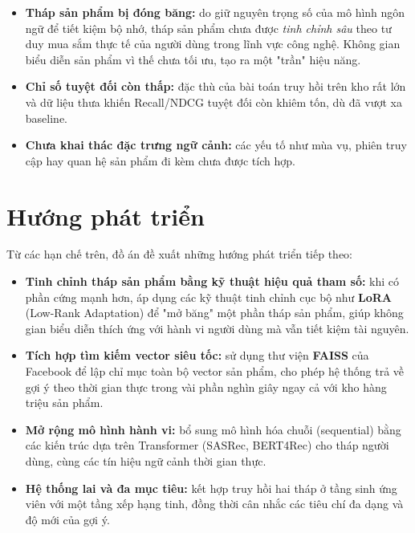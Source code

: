 \begin{itemize}[leftmargin=2em, itemsep=2pt]
    \item \textbf{Tháp sản phẩm bị đóng băng:} do giữ nguyên trọng số của mô hình
    ngôn ngữ để tiết kiệm bộ nhớ, tháp sản phẩm chưa được \textit{tinh chỉnh sâu}
    theo tư duy mua sắm thực tế của người dùng trong lĩnh vực công nghệ. Không gian
    biểu diễn sản phẩm vì thế chưa tối ưu, tạo ra một "trần" hiệu năng.
    \item \textbf{Chỉ số tuyệt đối còn thấp:} đặc thù của bài toán truy hồi trên kho
    rất lớn và dữ liệu thưa khiến Recall/NDCG tuyệt đối còn khiêm tốn, dù đã vượt xa
    baseline.
    \item \textbf{Chưa khai thác đặc trưng ngữ cảnh:} các yếu tố như mùa vụ, phiên
    truy cập hay quan hệ sản phẩm đi kèm chưa được tích hợp.
\end{itemize}

\section{Hướng phát triển}

Từ các hạn chế trên, đồ án đề xuất những hướng phát triển tiếp theo:

\begin{itemize}[leftmargin=2em, itemsep=2pt]
    \item \textbf{Tinh chỉnh tháp sản phẩm bằng kỹ thuật hiệu quả tham số:} khi có
    phần cứng mạnh hơn, áp dụng các kỹ thuật tinh chỉnh cục bộ như \textbf{LoRA}
    (Low-Rank Adaptation) để "mở băng" một phần tháp sản phẩm, giúp không gian biểu
    diễn thích ứng với hành vi người dùng mà vẫn tiết kiệm tài nguyên.
    \item \textbf{Tích hợp tìm kiếm vector siêu tốc:} sử dụng thư viện
    \textbf{FAISS} của Facebook để lập chỉ mục toàn bộ vector sản phẩm, cho phép hệ
    thống trả về gợi ý theo thời gian thực trong vài phần nghìn giây ngay cả với kho
    hàng triệu sản phẩm.
    \item \textbf{Mở rộng mô hình hành vi:} bổ sung mô hình hóa chuỗi (sequential)
    bằng các kiến trúc dựa trên Transformer (SASRec, BERT4Rec) cho tháp người dùng,
    cùng các tín hiệu ngữ cảnh thời gian thực.
    \item \textbf{Hệ thống lai và đa mục tiêu:} kết hợp truy hồi hai tháp ở tầng sinh
    ứng viên với một tầng xếp hạng tinh, đồng thời cân nhắc các tiêu chí đa dạng và
    độ mới của gợi ý.
\end{itemize}

